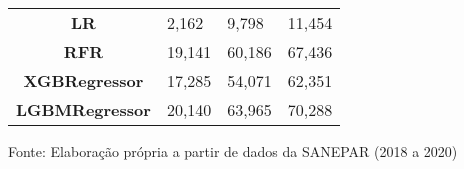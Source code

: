 \begin{table}[H]
\begin{tabular}{@{}clll@{}}
\textbf{LR}        & 2,162                             & 9,798                            & 11,454                            \\
\textbf{RFR}  & 19,141                            & 60,186                           & 67,436                            \\
\textbf{XGBRegressor}             & 17,285                            & 54,071                           & 62,351                            \\
\textbf{LGBMRegressor}            & 20,140                            & 63,965                           & 70,288                            \\ \bottomrule
	\end{tabular}

Fonte: Elaboração própria a partir de dados da SANEPAR (2018 a 2020)
\end{table}

